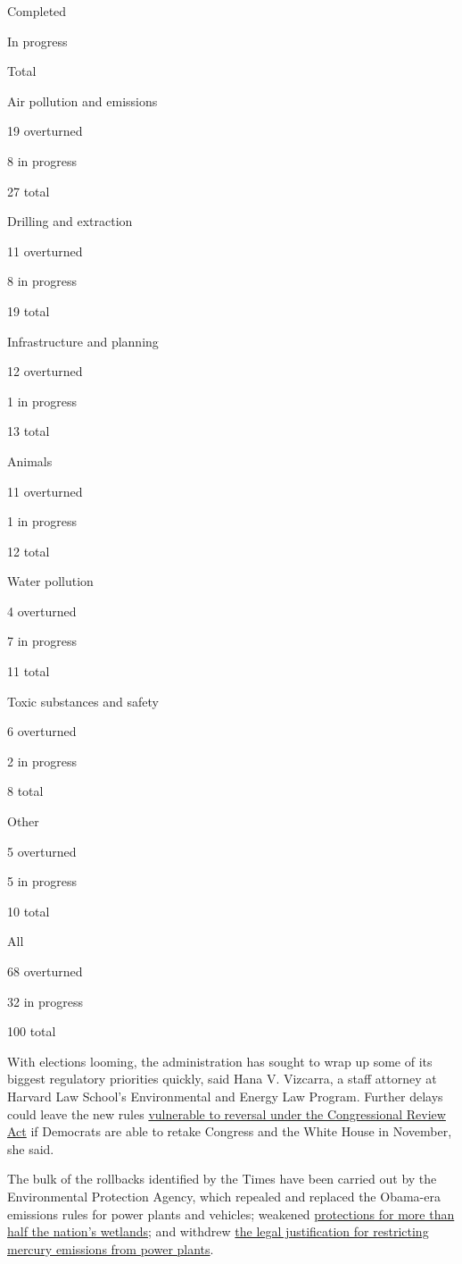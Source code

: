 Completed

In progress

Total

Air pollution and emissions

 19 overturned

 8 in progress

 27 total

Drilling and extraction

 11 overturned

 8 in progress

 19 total

Infrastructure and planning

 12 overturned

 1 in progress

 13 total

Animals

 11 overturned

 1 in progress

 12 total

Water pollution

 4 overturned

 7 in progress

 11 total

Toxic substances and safety

 6 overturned

 2 in progress

 8 total

Other

 5 overturned

 5 in progress

 10 total

All

 68 overturned

 32 in progress

 100 total

With elections looming, the administration has sought to wrap up some of
its biggest regulatory priorities quickly, said Hana V. Vizcarra, a
staff attorney at Harvard Law School's Environmental and Energy Law
Program. Further delays could leave the new rules
\href{https://www.nytimes3xbfgragh.onion/interactive/2017/05/01/us/politics/trump-obama-regulations-reversed.html}{vulnerable
to reversal under the Congressional Review Act} if Democrats are able to
retake Congress and the White House in November, she said.

The bulk of the rollbacks identified by the Times have been carried out
by the Environmental Protection Agency, which repealed and replaced the
Obama-era emissions rules for power plants and vehicles; weakened
\href{https://www.nytimes3xbfgragh.onion/2020/01/22/climate/trump-environment-water.html}{protections
for more than half the nation's wetlands}; and withdrew
\href{https://www.nytimes3xbfgragh.onion/2020/04/16/climate/epa-mercury-coal.html}{the
legal justification for restricting mercury emissions from power
plants}.

